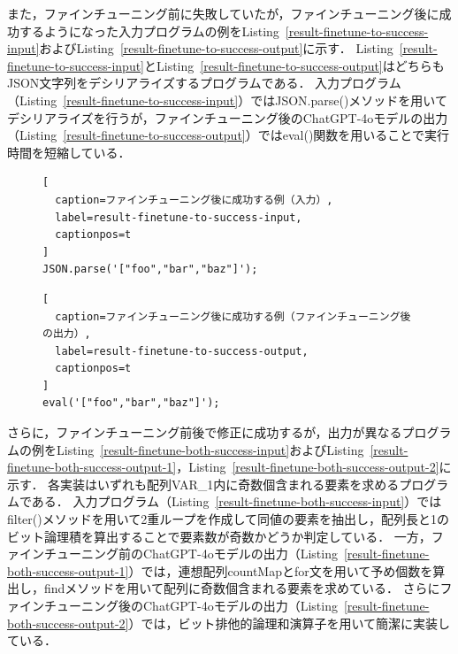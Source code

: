 \documentclass[11pt]{jreport}
\begin{document}
また，ファインチューニング前に失敗していたが，ファインチューニング後に成功するようになった入力プログラムの例をListing~\ref{result-finetune-to-success-input}およびListing~\ref{result-finetune-to-success-output}に示す．
Listing~\ref{result-finetune-to-success-input}とListing~\ref{result-finetune-to-success-output}はどちらもJSON文字列をデシリアライズするプログラムである．
入力プログラム（Listing~\ref{result-finetune-to-success-input}）ではJSON.parse()メソッドを用いてデシリアライズを行うが，ファインチューニング後のChatGPT-4oモデルの出力（Listing~\ref{result-finetune-to-success-output}）ではeval()関数を用いることで実行時間を短縮している．


\begin{figure}[t]
\captionsetup{name=Listing}
\hspace{0.04\columnwidth}
\begin{minipage}[b]{0.96\linewidth}
\begin{lstlisting}[
  caption=ファインチューニング後に成功する例（入力）,
  label=result-finetune-to-success-input,
  captionpos=t
]
JSON.parse('["foo","bar","baz"]');
\end{lstlisting}
\end{minipage}

\hspace{0.04\columnwidth}
\begin{minipage}[b]{0.96\linewidth}
\begin{lstlisting}[
  caption=ファインチューニング後に成功する例（ファインチューニング後の出力）,
  label=result-finetune-to-success-output,
  captionpos=t
]
eval('["foo","bar","baz"]');
\end{lstlisting}
\end{minipage}
\end{figure}


さらに，ファインチューニング前後で修正に成功するが，出力が異なるプログラムの例をListing~\ref{result-finetune-both-success-input}およびListing~\ref{result-finetune-both-success-output-1}，Listing~\ref{result-finetune-both-success-output-2}に示す．
各実装はいずれも配列VAR\_1内に奇数個含まれる要素を求めるプログラムである．
入力プログラム（Listing~\ref{result-finetune-both-success-input}）ではfilter()メソッドを用いて2重ループを作成して同値の要素を抽出し，配列長と1のビット論理積を算出することで要素数が奇数かどうか判定している．
一方，ファインチューニング前のChatGPT-4oモデルの出力（Listing~\ref{result-finetune-both-success-output-1}）では，連想配列countMapとfor文を用いて予め個数を算出し，findメソッドを用いて配列に奇数個含まれる要素を求めている．
さらにファインチューニング後のChatGPT-4oモデルの出力（Listing~\ref{result-finetune-both-success-output-2}）では，ビット排他的論理和演算子を用いて簡潔に実装している．
\end{document}
